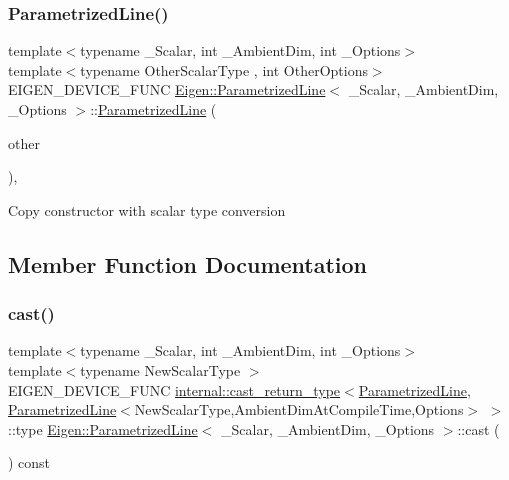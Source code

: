 \subsubsection{\texorpdfstring{ParametrizedLine()}{ParametrizedLine()}\hspace{0.1cm}{\footnotesize\ttfamily [5/5]}}
{\footnotesize\ttfamily template$<$typename \+\_\+\+Scalar, int \+\_\+\+Ambient\+Dim, int \+\_\+\+Options$>$ \\
template$<$typename Other\+Scalar\+Type , int Other\+Options$>$ \\
E\+I\+G\+E\+N\+\_\+\+D\+E\+V\+I\+C\+E\+\_\+\+F\+U\+NC \mbox{\hyperlink{class_eigen_1_1_parametrized_line}{Eigen\+::\+Parametrized\+Line}}$<$ \+\_\+\+Scalar, \+\_\+\+Ambient\+Dim, \+\_\+\+Options $>$\+::\mbox{\hyperlink{class_eigen_1_1_parametrized_line}{Parametrized\+Line}} (\begin{DoxyParamCaption}\item[{const \mbox{\hyperlink{class_eigen_1_1_parametrized_line}{Parametrized\+Line}}$<$ Other\+Scalar\+Type, Ambient\+Dim\+At\+Compile\+Time, Other\+Options $>$ \&}]{other }\end{DoxyParamCaption})\hspace{0.3cm}{\ttfamily [inline]}, {\ttfamily [explicit]}}

Copy constructor with scalar type conversion 

\subsection{Member Function Documentation}
\mbox{\label{class_eigen_1_1_parametrized_line_a2f48ba47cd487a3550b4371f01c3271c}} 
\subsubsection{\texorpdfstring{cast()}{cast()}}
{\footnotesize\ttfamily template$<$typename \+\_\+\+Scalar, int \+\_\+\+Ambient\+Dim, int \+\_\+\+Options$>$ \\
template$<$typename New\+Scalar\+Type $>$ \\
E\+I\+G\+E\+N\+\_\+\+D\+E\+V\+I\+C\+E\+\_\+\+F\+U\+NC \mbox{\hyperlink{struct_eigen_1_1internal_1_1cast__return__type}{internal\+::cast\+\_\+return\+\_\+type}}$<$\mbox{\hyperlink{class_eigen_1_1_parametrized_line}{Parametrized\+Line}}, \mbox{\hyperlink{class_eigen_1_1_parametrized_line}{Parametrized\+Line}}$<$New\+Scalar\+Type,Ambient\+Dim\+At\+Compile\+Time,Options$>$ $>$\+::type \mbox{\hyperlink{class_eigen_1_1_parametrized_line}{Eigen\+::\+Parametrized\+Line}}$<$ \+\_\+\+Scalar, \+\_\+\+Ambient\+Dim, \+\_\+\+Options $>$\+::cast (\begin{DoxyParamCaption}{ }\end{DoxyParamCaption}) const\hspace{0.3cm}{\ttfamily [inline]}}

